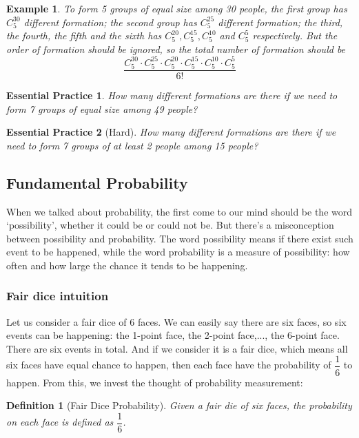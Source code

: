 \documentclass[12pt]{article}
\newtheorem{definition}{Definition}[section]
\newtheorem*{example}{Example}
\newtheorem{exercise}{Essential Practice}[subsection]
\begin{document}
    \begin{example}
        To form 5 groups of equal size among 30 people, the first group has $C_5^{30}$ different formation; the second group has $C_5^{25}$ different formation; the third, the fourth, the fifth and the sixth has $C_5^{20}, C_5^{15}, C_5^{10}$ and $C_5^5$ respectively. But the order of formation should be ignored, so the total number of formation should be $$\frac{C_5^{30} \cdot C_5^{25} \cdot C_5^{20} \cdot C_5^{15} \cdot C_5^{10} \cdot C_5^5}{6!}$$
    \end{example}

    \begin{exercise}
        How many different formations are there if we need to form 7 groups of equal size among 49 people?
    \end{exercise}

    \begin{exercise}[Hard]
        How many different formations are there if we need to form 7 groups of at least 2 people among 15 people?
    \end{exercise}

    \subsection{Fundamental Probability}

    When we talked about probability, the first come to our mind should be the word `possibility', whether it could be or could not be. But there's a misconception between possibility and probability. The word possibility means if there exist such event to be happened, while the word probability is a measure of possibility: how often and how large the chance it tends to be happening.

    \subsubsection*{Fair dice intuition}

    Let us consider a fair dice of 6 faces. We can easily say there are six faces, so six events can be happening: the 1-point face, the 2-point face,..., the 6-point face. There are six events in total. And if we consider it is a fair dice, which means all six faces have equal chance to happen, then each face have the probability of $\dfrac{1}{6}$ to happen. From this, we invest the thought of probability measurement:

    \begin{definition}[Fair Dice Probability]
        Given a fair die of six faces, the probability on each face is defined as $\dfrac{1}{6}$.
    \end{definition}
\end{document}
